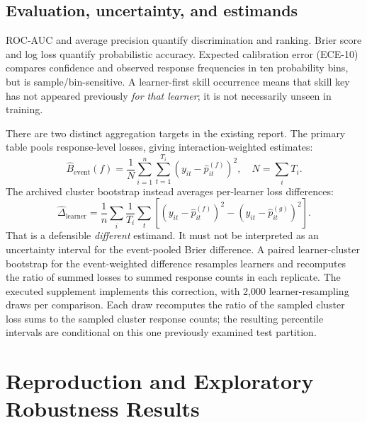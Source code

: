 \documentclass[11pt,a4paper]{article}
\begin{document}
\subsection{Evaluation, uncertainty, and estimands}
ROC-AUC and average precision quantify discrimination and ranking. Brier score and log loss quantify probabilistic accuracy. Expected calibration error (ECE-10) compares confidence and observed response frequencies in ten probability bins, but is sample/bin-sensitive. A learner-first skill occurrence means that skill key has not appeared previously \emph{for that learner}; it is not necessarily unseen in training.

There are two distinct aggregation targets in the existing report. The primary table pools response-level losses, giving interaction-weighted estimates:
\begin{equation}
\widehat{B}_{\mathrm{event}}(f)=\frac{1}{N}\sum_{i=1}^{n}\sum_{t=1}^{T_i}(y_{it}-\hat p_{it}^{(f)})^2,\quad N=\sum_i T_i.
\end{equation}
The archived cluster bootstrap instead averages per-learner loss differences:
\begin{equation}
\widehat{\Delta}_{\mathrm{learner}}=\frac{1}{n}\sum_i\frac{1}{T_i}\sum_t\left[(y_{it}-\hat p_{it}^{(f)})^2-(y_{it}-\hat p_{it}^{(g)})^2\right].
\end{equation}
That is a defensible \emph{different} estimand. It must not be interpreted as an uncertainty interval for the event-pooled Brier difference. A paired learner-cluster bootstrap for the event-weighted difference resamples learners and recomputes the ratio of summed losses to summed response counts in each replicate. The executed supplement implements this correction, with 2,000 learner-resampling draws per comparison. Each draw recomputes the ratio of the sampled cluster loss sums to the sampled cluster response counts; the resulting percentile intervals are conditional on this one previously examined test partition.

\section{Reproduction and Exploratory Robustness Results}
\end{document}
